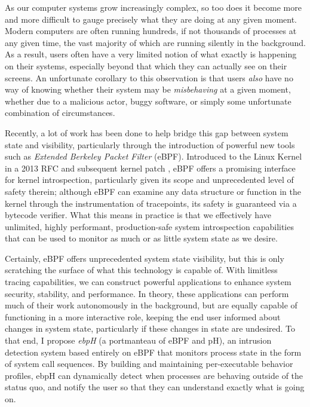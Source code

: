 \documentclass[
  12pt]{findlay}
\begin{document}
As our computer systems grow increasingly complex, so too does it become
more and more difficult to gauge precisely what they are doing at any
given moment. Modern computers are often running hundreds, if not
thousands of processes at any given time, the vast majority of which are
running silently in the background. As a result, users often have a very
limited notion of what exactly is happening on their systems, especially
beyond that which they can actually see on their screens. An unfortunate
corollary to this observation is that users \emph{also} have no way of
knowing whether their system may be \emph{misbehaving} at a given
moment, whether due to a malicious actor, buggy software, or simply some
unfortunate combination of circumstances.

Recently, a lot of work has been done to help bridge this gap between
system state and visibility, particularly through the introduction of
powerful new tools such as \emph{Extended Berkeley Packet Filter}
(eBPF). Introduced to the Linux Kernel in a 2013 RFC and subsequent
kernel patch \autocite{starovoitov13}, eBPF offers a promising interface
for kernel introspection, particularly given its scope and unprecedented
level of safety therein; although eBPF can examine any data structure or
function in the kernel through the instrumentation of tracepoints, its
safety is guaranteed via a bytecode verifier. What this means in
practice is that we effectively have unlimited, highly performant,
production-safe system introspection capabilities that can be used to
monitor as much or as little system state as we desire.

Certainly, eBPF offers unprecedented system state visibility, but this
is only scratching the surface of what this technology is capable of.
With limitless tracing capabilities, we can construct powerful
applications to enhance system security, stability, and performance. In
theory, these applications can perform much of their work autonomously
in the background, but are equally capable of functioning in a more
interactive role, keeping the end user informed about changes in system
state, particularly if these changes in state are undesired. To that
end, I propose \emph{ebpH} (a portmanteau of eBPF and pH), an intrusion
detection system based entirely on eBPF that monitors process state in
the form of system call sequences. By building and maintaining
per-executable behavior profiles, ebpH can dynamically detect when
processes are behaving outside of the status quo, and notify the user so
that they can understand exactly what is going on.
\end{document}
